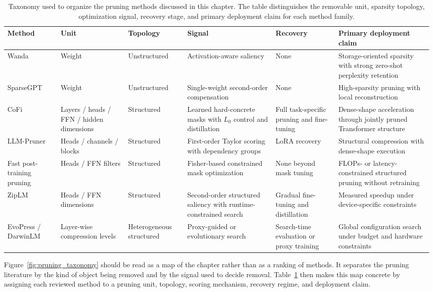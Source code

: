 \begin{table}[H]
	\centering
	\caption{Taxonomy used to organize the pruning methods discussed in this chapter. The table distinguishes the removable unit, sparsity topology, optimization signal, recovery stage, and primary deployment claim for each method family.}
	\label{tab:pruning_taxonomy}
	\begin{tabularx}{\textwidth}{@{}l >{\raggedright\arraybackslash}X >{\raggedright\arraybackslash}X >{\raggedright\arraybackslash}X >{\raggedright\arraybackslash}X >{\raggedright\arraybackslash}X@{}}
		\toprule
		\textbf{Method} & \textbf{Unit} & \textbf{Topology} & \textbf{Signal} & \textbf{Recovery} & \textbf{Primary deployment claim} \\
		\midrule
		Wanda & Weight & Unstructured & Activation-aware saliency & None & Storage-oriented sparsity with strong zero-shot perplexity retention \\
		SparseGPT & Weight & Unstructured & Single-weight second-order compensation & None & High-sparsity pruning with local reconstruction \\
		CoFi & Layers / heads / FFN / hidden dimensions & Structured & Learned hard-concrete masks with $L_0$ control and distillation & Full task-specific pruning and fine-tuning & Dense-shape acceleration through jointly pruned Transformer structure \\
		LLM-Pruner & Heads / channels / blocks & Structured & First-order Taylor scoring with dependency groups & LoRA recovery & Structural compression with dense-shape execution \\
		Fast post-training pruning & Heads / FFN filters & Structured & Fisher-based constrained mask optimization & None beyond mask tuning & FLOPs- or latency-constrained structured pruning without retraining \\
		ZipLM & Heads / FFN dimensions & Structured & Second-order structured saliency with runtime-constrained search & Gradual fine-tuning and distillation & Measured speedup under device-specific constraints \\
		EvoPress / DarwinLM & Layer-wise compression levels & Heterogeneous structured & Proxy-guided or evolutionary search & Search-time evaluation or proxy training & Global configuration search under budget and hardware constraints \\
		\bottomrule
	\end{tabularx}
\end{table}

Figure~\ref{fig:pruning_taxonomy} should be read as a map of the chapter rather than as a ranking of methods. It separates the pruning literature by the kind of object being removed and by the signal used to decide removal. Table~\ref{tab:pruning_taxonomy} then makes this map concrete by assigning each reviewed method to a pruning unit, topology, scoring mechanism, recovery regime, and deployment claim.

